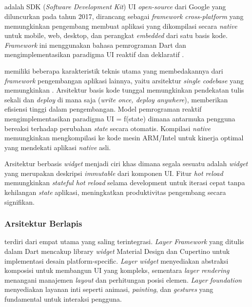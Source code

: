 \subsection{\flutter}
\label{subsec:flutter}

\flutter{} adalah SDK (\emph{Software Development Kit}) UI \emph{open-source} dari Google yang diluncurkan pada tahun 2017, dirancang sebagai \emph{framework cross-platform} yang memungkinkan pengembang membuat aplikasi yang dikompilasi secara \emph{native} untuk mobile, web, desktop, dan perangkat \emph{embedded} dari satu basis kode. \emph{Framework} ini menggunakan bahasa pemrograman Dart dan mengimplementasikan paradigma UI reaktif dan deklaratif \parencite{flutter2021}.

\flutter memiliki beberapa karakteristik teknis utama yang membedakannya dari \emph{framework} pengembangan aplikasi lainnya, yaitu arsitektur \emph{single codebase} yang memungkinkan . Arsitektur basis kode tunggal memungkinkan pendekatan tulis sekali dan \emph{deploy} di mana saja (\emph{write once, deploy anywhere}), memberikan efisiensi tinggi dalam pengembangan. Model pemrograman reaktif mengimplementasikan paradigma UI = f(state) dimana antarmuka pengguna bereaksi terhadap perubahan \emph{state} secara otomatis. Kompilasi \emph{native} memungkinkan \flutter mengkompilasi ke kode mesin ARM/Intel untuk kinerja optimal yang mendekati aplikasi \emph{native} asli.

Arsitektur berbasis \emph{widget} menjadi ciri khas \flutter dimana segala sesuatu adalah \emph{widget} yang merupakan deskripsi \emph{immutable} dari komponen UI. Fitur \emph{hot reload} memungkinkan \emph{stateful hot reload} selama development untuk iterasi cepat tanpa kehilangan \emph{state} aplikasi, meningkatkan produktivitas pengembang secara signifikan.

\subsubsection{Arsitektur Berlapis}

\flutter terdiri dari empat \layer utama yang saling terintegrasi. \emph{Layer Framework} yang ditulis dalam Dart mencakup library \emph{widget} Material Design dan Cupertino untuk implementasi desain platform-specific. \emph{Layer widget} menyediakan abstraksi komposisi untuk membangun UI yang kompleks, sementara \emph{layer rendering} menangani manajemen \emph{layout} dan perhitungan posisi elemen. \emph{Layer foundation} menyediakan layanan inti seperti animasi, \emph{painting}, dan \emph{gestures} yang fundamental untuk interaksi pengguna.

